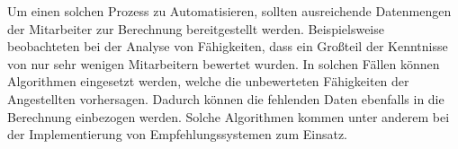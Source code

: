 Um einen solchen Prozess zu Automatisieren, sollten ausreichende Datenmengen der Mitarbeiter zur Berechnung bereitgestellt werden. Beispielsweise beobachteten \textcite[S. 3]{mitre:2014} bei der Analyse von Fähigkeiten, dass ein Großteil der Kenntnisse von nur sehr wenigen Mitarbeitern bewertet wurden. In solchen Fällen können Algorithmen eingesetzt werden, welche die unbewerteten Fähigkeiten der Angestellten vorhersagen. Dadurch können die fehlenden Daten ebenfalls in die Berechnung einbezogen werden. Solche Algorithmen kommen unter anderem bei der Implementierung von Empfehlungssystemen zum Einsatz.
